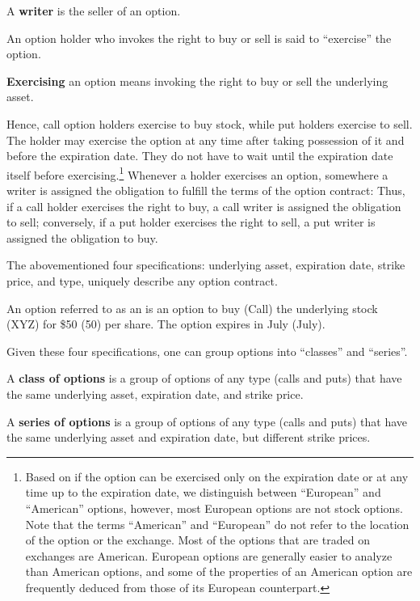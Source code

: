 \bd[Writer]
A \textbf{writer} is the seller of an option.
\ed

An option holder who invokes the right to buy or sell is said to ``exercise'' the option.

\bd[Exercise]
\textbf{Exercising} an option means invoking the right to buy or sell the underlying asset.
\ed

Hence, call option holders exercise to buy stock, while put holders exercise to sell. The holder may exercise the option
at any time after taking possession of it and before the expiration date. They do not have to wait until the expiration
date itself before exercising.\footnote{Based on if the option can be exercised only on the expiration date or at any
time up to the expiration date, we distinguish between ``European'' and ``American'' options, however, most European
options are not stock options. Note that the terms ``American'' and ``European'' do not refer to the location of the
option or the exchange. Most of the options that are traded on exchanges are American. European options are generally
easier to analyze than American options, and some of the properties of an American option are frequently deduced from
those of its European counterpart.} Whenever a holder exercises an option, somewhere a writer is assigned the obligation
to fulfill the terms of the option contract: Thus, if a call holder exercises the right to buy, a call writer is
assigned the obligation to sell; conversely, if a put holder exercises the right to sell, a put writer is assigned the
obligation to buy.




The abovementioned four specifications: underlying asset, expiration date, strike price, and type, uniquely describe
any option contract.

\be
An option referred to as an  is an option to buy (Call) the underlying stock (XYZ) for \$50
(50) per share. The option expires in July (July).
\ee

Given these four specifications, one can group options into ``classes'' and ``series''.

A \textbf{class of options} is a group of options of any type (calls and puts) that have the same underlying asset,
expiration date, and strike price.
\ed

A \textbf{series of options} is a group of options of any type (calls and puts) that have the same underlying asset and
expiration date, but different strike prices.
\ed

